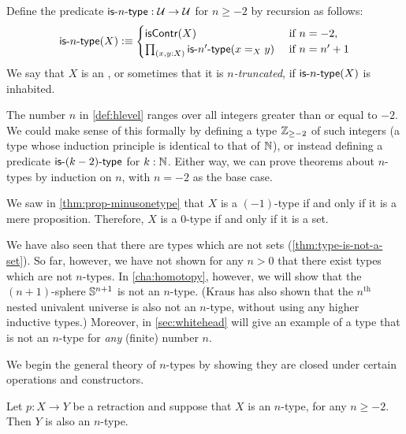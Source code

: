 \begin{defn}\label{def:hlevel}
  Define the predicate $\mathsf{is}\mbox{-}{n}\mbox{-}\mathsf{type} : \mathcal{U} \to \mathcal{U}$ for $n \geq -2$ by recursion as follows:
  \[ \istype{n}(X) \defeq
  \begin{cases}
    \iscontr(X) & \text{ if } n = -2 , \\
    \prd{x,y : X} \istype{n'}(\id[X]{x}{y}) & \text{ if } n = n'+1
  \end{cases}
  \]
  We say that $X$ is an , or sometimes that it is \emph{$n$-truncated},
 if $\mathsf{is}\mbox{-}{n}\mbox{-}\mathsf{type}(X)$ is inhabited.
\end{defn}

\begin{rmk}
  The number $n$ in \autoref{def:hlevel} ranges over all integers greater than or equal to $-2$.
  We could make sense of this formally by defining a type $\mathbb{Z}_{{\geq}-2}$ of such integers (a type whose induction principle is identical to that of $\mathbb{N}$), or instead defining a predicate $\mathsf{is}\mbox{-}{(k-2)}\mbox{-}\mathsf{type}$ for $k : \mathbb{N}$.
  Either way, we can prove theorems about $n$-types by induction on $n$, with $n = -2$ as the base case.
\end{rmk}

\begin{eg}
  We saw in \autoref{thm:prop-minusonetype} that $X$ is a $(-1)$-type if and only if it is a mere proposition.
  Therefore, $X$ is a $0$-type if and only if it is a set.
\end{eg}

We have also seen that there are types which are not sets (\autoref{thm:type-is-not-a-set}).
So far, however, we have not shown for any $n>0$ that there exist types which are not $n$-types.
In \autoref{cha:homotopy}, however, we will show that the $(n+1)$-sphere $\mathbb{S}^{n+1}$ is not an $n$-type.
(Kraus has also shown that the $n^{\mathrm{th}}$ nested univalent universe is also not an $n$-type, without using any higher inductive types.)
Moreover, in \autoref{sec:whitehead} will give an example of a type that is not an $n$-type for \emph{any} (finite) number $n$.

We begin the general theory of $n$-types by showing they are closed under certain operations and constructors.

\begin{thm}\label{thm:h-level-retracts}
 Let $p : X \to Y$ be a retraction and suppose that $X$ is an $n$-type, for any $n\geq -2$.
 Then $Y$ is also an $n$-type.
\end{thm}

